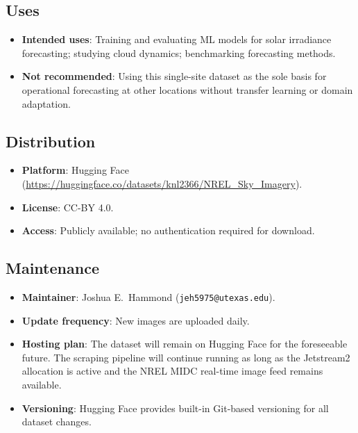 \documentclass[twoside,11pt]{article}
\begin{document}
\subsection*{Uses}
\begin{itemize}
    \item \textbf{Intended uses}: Training and evaluating ML models for solar irradiance forecasting; studying cloud dynamics; benchmarking forecasting methods.
    \item \textbf{Not recommended}: Using this single-site dataset as the sole basis for operational forecasting at other locations without transfer learning or domain adaptation.
\end{itemize}

\subsection*{Distribution}
\begin{itemize}
    \item \textbf{Platform}: Hugging Face (\url{https://huggingface.co/datasets/knl2366/NREL_Sky_Imagery}).
    \item \textbf{License}: CC-BY 4.0.
    \item \textbf{Access}: Publicly available; no authentication required for download.
\end{itemize}

\subsection*{Maintenance}
\begin{itemize}
    \item \textbf{Maintainer}: Joshua E.\ Hammond (\texttt{jeh5975@utexas.edu}).
    \item \textbf{Update frequency}: New images are uploaded daily.
    \item \textbf{Hosting plan}: The dataset will remain on Hugging Face for the foreseeable future. The scraping pipeline will continue running as long as the Jetstream2 allocation is active and the NREL MIDC real-time image feed remains available.
    \item \textbf{Versioning}: Hugging Face provides built-in Git-based versioning for all dataset changes.
\end{itemize}
\end{document}
